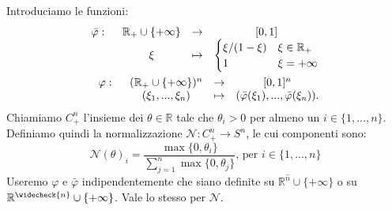 Introduciamo le funzioni:
\begin{equation}
    \begin{split}
    \begin{array}{l c c c}
        \bar{\varphi}:\text{ } & \mathbb{R}_+\cup\{+\infty\} & \to & [0,1]\\
        & \xi & \mapsto &
        \begin{cases}
            \xi/(1-\xi)&\xi\in\mathbb{R}_+\\
            1 & \xi=+\infty
        \end{cases}
    \end{array}\\
    \begin{array}{l c c c}
        \varphi:\text{ } & (\mathbb{R}_+\cup\{+\infty\})^n & \to & [0,1]^n\\
        & (\xi_1,...,\xi_n) & \mapsto & (\bar{\varphi}(\xi_1),...,\bar{\varphi}(\xi_n)).
    \end{array}
    \end{split}
    \label{eq:4}
\end{equation}
Chiamiamo $C_+^n$ l'insieme dei $\theta\in\mathbb{R}$ tale che $\theta_i>0$ per almeno un $i\in\{1,...,n\}$.
Definiamo quindi la normalizzazione $\mathscr{N}:C_+^n\to S^n$, le cui componenti sono:
\begin{equation}
    \mathscr{N}(\theta)_i=\frac{\max\{0,\theta_i\}}{\sum_{j=1}^{n}\max\{0,\theta_j\}}\text{, per }i\in\{1,...,n\}
    \label{eq:5}
\end{equation}
Useremo $\varphi$ e $\bar{\varphi}$ indipendentemente che siano definite su $\mathbb{R}^{\widehat{n}}\cup\{+\infty\}$ o
su $\mathbb{R}^{\widecheck{n}}\cup\{+\infty\}$. Vale lo stesso per $\mathscr{N}$.

